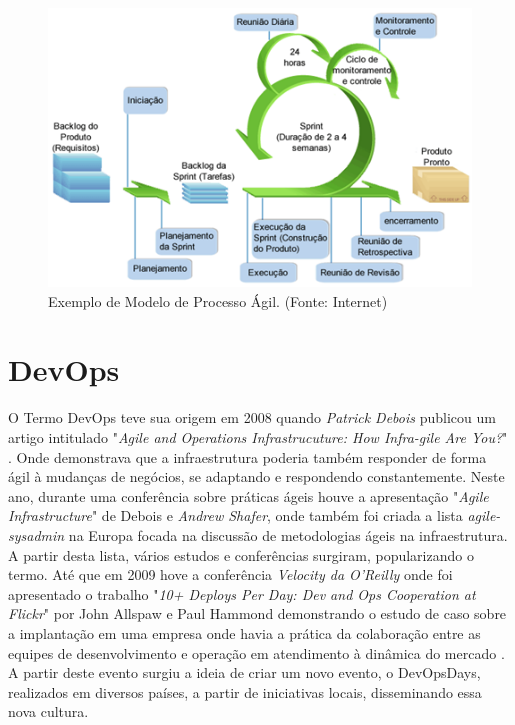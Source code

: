 \begin{figure}[H]
\centering
\includegraphics[width=.75\textwidth]{fig/figura23.png}
\caption{Exemplo de Modelo de Processo Ágil. (Fonte: Internet)}
\label{fig:figure23}
\end{figure}

\section{DevOps}
\label{sec:devops}

O Termo DevOps teve sua origem em 2008 quando \textit{Patrick Debois} publicou um artigo intitulado "\textit{Agile and Operations Infrastrucuture: How Infra-gile Are You?}" \cite{Debois2008}. Onde demonstrava que a infraestrutura poderia também responder de forma ágil à mudanças de negócios, se adaptando e respondendo constantemente. Neste ano, durante uma conferência sobre práticas ágeis houve a apresentação "\textit{Agile Infrastructure}" de Debois e \textit{Andrew Shafer}, onde também foi criada a lista \textit{agile-sysadmin} na Europa focada na discussão de metodologias ágeis na infraestrutura. A partir desta lista, vários estudos e conferências surgiram, popularizando o termo. Até que em 2009 hove a conferência \textit{Velocity da O’Reilly} onde foi apresentado o trabalho "\textit{10+ Deploys Per Day: Dev and Ops Cooperation at Flickr}" por  John Allspaw e Paul Hammond demonstrando o estudo de caso sobre a implantação em uma empresa onde havia a prática da colaboração entre as equipes de desenvolvimento e operação em atendimento à dinâmica do mercado \cite{ALLSPAW2009}. A partir deste evento surgiu a ideia de criar um novo evento, o DevOpsDays, realizados em diversos países, a partir de iniciativas locais, disseminando essa nova cultura.

